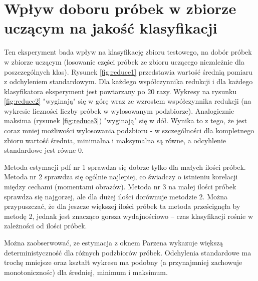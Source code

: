 \documentclass[a4paper]{article}
\begin{document}
\section{Wpływ doboru próbek w zbiorze uczącym na jakość klasyfikacji}\label{reduce}

Ten eksperyment bada wpływ na klasyfikację zbioru testowego, na dobór próbek w zbiorze
uczącym (losowanie części próbek ze zbioru uczącego niezależnie dla poszczególnych klas).
Rysunek \ref{fig:reduce1} przedstawia wartość średnią pomiaru z odchyleniem standardowym.
Dla każdego współczynnika redukcji i dla każdego klasyfikatora eksperyment jest powtarzany po 20 razy.
Wykresy na rysunku \ref{fig:reduce2} "wyginają" się w górę wraz ze wzrostem współczynnika redukcji
(na wykresie liczności liczby próbek w wylosowanym podzbiorze).
Analogicznie maksima (rysunek \ref{fig:reduce3}) "wyginają" się w dół.
Wynika to z tego, że jest coraz mniej możliwości wylosowania podzbioru - w szczególności dla kompletnego zbioru wartość średnia, minimalna i maksymalna są równe,
a odcyhlenie standardowe jest równe 0.

Metoda estymacji pdf nr 1 sprawdza się dobrze tylko dla małych ilości próbek.
Metoda nr 2 sprawdza się ogólnie najlepiej, co świadczy o istnieniu korelacji między cechami (momentami obrazów).
Metoda nr 3 na małej ilości próbek sprawdza się najgorzej, ale dla dużej ilości dorównuje metodzie 2.
Można przypuszczać, że dla jeszcze większej ilości próbek ta metoda prześcignęła by metodę 2,
jednak jest znacząco gorsza wydajnościowo -- czas klasyfikacji rośnie w zależności od ilości próbek.

Można zaobserwować, ze estymacja z oknem Parzena wykazuje większą deterministyczność dla różnych podzbiorów próbek.
Odchylenia standardowe ma trochę mniejsze oraz kształt wykresu ma podobny
(a przynajmniej zachowuje monotonicznośc) dla średniej, minimum i maksimum.
\end{document}

